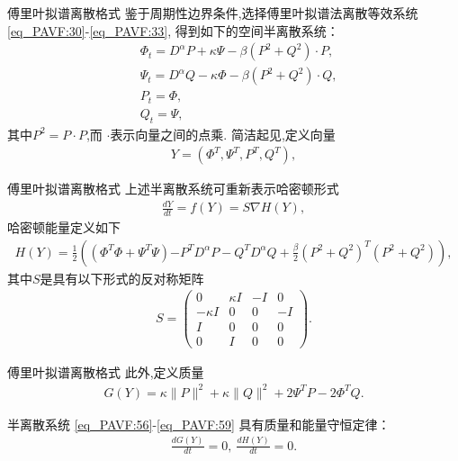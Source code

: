 \documentclass[aspectratio=169]{beamer}
\numberwithin{theorem}{section} %
\begin{document}
\begin{frame}{傅里叶拟谱离散格式}
	鉴于周期性边界条件,选择傅里叶拟谱法离散等效系统 \eqref{eq_PAVF:30}-\eqref{eq_PAVF:33},
	得到如下的空间半离散系统：
	\begin{align}
	&\varPhi_{t}=D^{\alpha}P+\kappa \Psi-\beta \left( P^{2}+Q^{2}\right)\cdot P,\label{eq_PAVF:56}\\
	&\Psi_{t}=D^{\alpha}Q-\kappa \varPhi-\beta \left( P^{2}+Q^{2}\right)\cdot Q,\label{eq_PAVF:57}\\
	&P_t=\varPhi,\label{eq_PAVF:58}\\
	&Q_t=\Psi,\label{eq_PAVF:59}
	\end{align}
	其中$P^{2}=P \cdot P$,而 $\cdot$表示向量之间的点乘.
	简洁起见,定义向量
\begin{align}\label{eq_PAVF:60a}
Y=\left(\varPhi^{T}, \Psi^{T}, P^{T}, Q^{T}\right),
\end{align}
\end{frame}
\begin{frame}{傅里叶拟谱离散格式}
	上述半离散系统可重新表示哈密顿形式
	\begin{align}\label{eq_PAVF:60}
	\frac{d Y}{d t}=f(Y)=S \nabla H(Y),
	\end{align}
	哈密顿能量定义如下
	\begin{align}\label{eq_PAVF:61}
		H(Y)=\frac{1}{2}\left((\varPhi^{T}\varPhi+\Psi^{T}\Psi){-P^{T} D^{\alpha} P-Q^{T} D^{\alpha} Q}+\frac{\beta}{2}(P^2+Q^2)^{T}(P^2+Q^2)\right),
	\end{align}
	其中$S$是具有以下形式的反对称矩阵
	\begin{align}\label{eq_PAVF:62}
	S=\left(\begin{array}{cccc}
	0 & \kappa I & -I & 0 \\
	-\kappa I & 0 & 0 & -I \\
	I & 0 & 0 & 0 \\
	0 & I & 0 & 0
	\end{array}\right).
	\end{align}
	
\end{frame}
\begin{frame}{傅里叶拟谱离散格式}
	此外,定义质量
	\begin{align}\label{eq_PAVF:63}
	G(Y)=\kappa\|P\|^{2}+\kappa\|Q\|^{2} +2\Psi^{T}P-2\varPhi^{T}Q.
	\end{align}
	
\begin{theorem}	\label{thm_PAVF:3}
	半离散系统 \eqref{eq_PAVF:56}-\eqref{eq_PAVF:59} 具有质量和能量守恒定律：
\begin{align}
\frac{d G(Y)}{d t}=0,~\frac{d H(Y)}{d t}=0.
\end{align}
\end{theorem} 
\end{frame}
\end{document}
